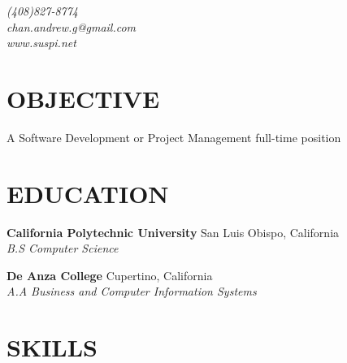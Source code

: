 \documentclass[margin,line]{resume}
\begin{document}
\fontsize{9.5pt}{9.5pt}\selectfont
\def \identsize {12mm}

{
  \sc
    \hfill {\infosize\textsl{(408)827-8774}}            \\\vspace{0mm}
    \hfill {\infosize\textsl{chan.andrew.g@gmail.com}}  \\\vspace{0mm}
    \hfill {\infosize\textsl{www.suspi.net}}            \\\vspace{-10mm}
}

\begin{resume}

\vspace{1mm}

    \section{\mysidestyle \textbf{\large{O}\small{BJECTIVE}}}

    A Software Development or Project Management full-time position

\sectionline

    \section{\mysidestyle \textbf{\large{E}\small{DUCATION}}}

    \textbf{\listing California Polytechnic University} \hfill San Luis Obispo, California\\
    \hspace*{\identsize} \textsl{B.S Computer Science} \vspace{-2.5mm}
    
    \textbf{\listing De Anza College} \hfill Cupertino, California\\
    \hspace*{\identsize} \textsl{A.A Business and Computer Information Systems}

\sectionline

    \section{\mysidestyle \textbf{\large{S}\small{KILLS}}}


\end{resume}
\end{document}

